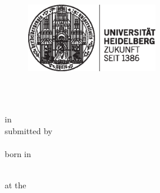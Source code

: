 \begin{titlepage}
\pagestyle{empty}

\begin{figure}[ht]
\includegraphics[height=3cm]{content/pictures/hd_siegel.eps}
\end{figure}


\begin{center}
	\renewcommand{\baselinestretch}{2.00}
	\Large\sffamily
	\docFakultaet \\
	\large \docUniversitaet
	\par\vfill\normalfont
	\docArtDerArbeit \\
	in \docStudiengang\\
	submitted by\\
	\docVorname~\docNachname\\
	born in \docGeburtsort\\
	\docAbgabejahr
\end{center}
\newpage


\begin{center}
{\fontsize{18}{22} \selectfont \docArtDerArbeit}\\[5mm]
{\fontsize{18}{22} \selectfont at the} \\[5mm]
{\fontsize{18}{22} \selectfont \docInstitut}\\
\vspace{1cm}
\begin{onehalfspace}
{\fontsize{22}{26} \selectfont \textbf{\docTitle}}\\[5mm]
{\fontsize{18}{22} \selectfont \docUntertitle}


\end{onehalfspace}
\end{center}


\end{titlepage}
